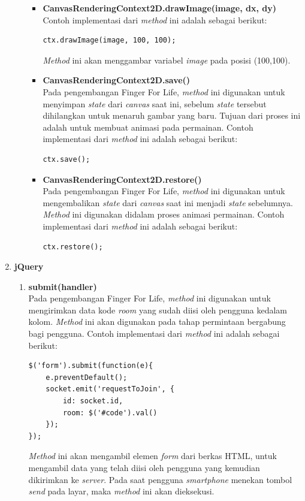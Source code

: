 \begin{enumerate}
\begin{enumerate}
\begin{itemize}
			\item \textbf{CanvasRenderingContext2D.drawImage(image, dx, dy)} \\
			Contoh implementasi dari \textit{method} ini adalah sebagai berikut:
\begin{lstlisting}
ctx.drawImage(image, 100, 100);
\end{lstlisting}
\textit{Method} ini akan menggambar variabel \textit{image} pada posisi (100,100).

			\item \textbf{CanvasRenderingContext2D.save()} \\
			Pada pengembangan Finger For Life, \textit{method} ini digunakan untuk menyimpan \textit{state} dari \textit{canvas} saat ini, sebelum \textit{state} tersebut dihilangkan untuk menaruh gambar yang baru. Tujuan dari proses ini adalah untuk membuat animasi pada permainan. Contoh implementasi dari \textit{method} ini adalah sebagai berikut:
\begin{lstlisting}
ctx.save();
\end{lstlisting}	

			\item \textbf{CanvasRenderingContext2D.restore()} \\
			Pada pengembangan Finger For Life, \textit{method} ini digunakan untuk mengembalikan \textit{state} dari \textit{canvas} saat ini menjadi \textit{state} sebelumnya. \textit{Method} ini digunakan didalam proses animasi permainan. Contoh implementasi dari \textit{method} ini adalah sebagai berikut:
\begin{lstlisting}
ctx.restore();
\end{lstlisting}
		\end{itemize}
	\end{enumerate}
	
	\item \textbf{jQuery} 
	\begin{enumerate}
		\item \textbf{submit(handler)} \\
		Pada pengembangan Finger For Life, \textit{method} ini digunakan untuk mengirimkan data kode \textit{room} yang sudah diisi oleh pengguna kedalam kolom. \textit{Method} ini akan digunakan pada tahap permintaan bergabung bagi pengguna. Contoh implementasi dari \textit{method} ini adalah sebagai berikut:
\begin{lstlisting}
$('form').submit(function(e){
	e.preventDefault();
	socket.emit('requestToJoin', {
		id: socket.id,
		room: $('#code').val()
	});
});
\end{lstlisting}
\textit{Method} ini akan mengambil elemen \textit{form} dari berkas HTML, untuk mengambil data yang telah diisi oleh pengguna yang kemudian dikirimkan ke \textit{server}. Pada saat pengguna \textit{smartphone} menekan tombol \textit{send} pada layar, maka \textit{method} ini akan dieksekusi.
		

\end{enumerate}
\end{enumerate}
